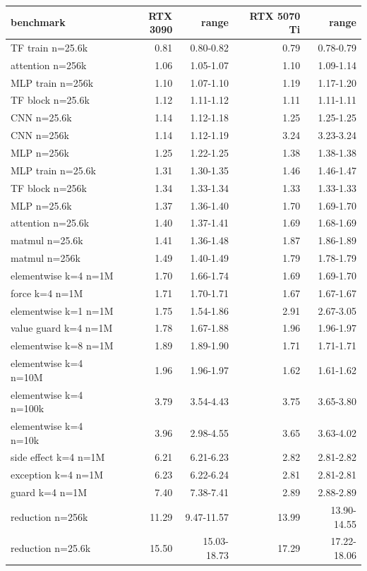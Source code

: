 \begin{tabular}{lrrrr}
\toprule
benchmark & RTX 3090 & range & RTX 5070 Ti & range \\
\midrule
TF train n=25.6k & 0.81 & 0.80-0.82 & 0.79 & 0.78-0.79 \\
attention n=256k & 1.06 & 1.05-1.07 & 1.10 & 1.09-1.14 \\
MLP train n=256k & 1.10 & 1.07-1.10 & 1.19 & 1.17-1.20 \\
TF block n=25.6k & 1.12 & 1.11-1.12 & 1.11 & 1.11-1.11 \\
CNN n=25.6k & 1.14 & 1.12-1.18 & 1.25 & 1.25-1.25 \\
CNN n=256k & 1.14 & 1.12-1.19 & 3.24 & 3.23-3.24 \\
MLP n=256k & 1.25 & 1.22-1.25 & 1.38 & 1.38-1.38 \\
MLP train n=25.6k & 1.31 & 1.30-1.35 & 1.46 & 1.46-1.47 \\
TF block n=256k & 1.34 & 1.33-1.34 & 1.33 & 1.33-1.33 \\
MLP n=25.6k & 1.37 & 1.36-1.40 & 1.70 & 1.69-1.70 \\
attention n=25.6k & 1.40 & 1.37-1.41 & 1.69 & 1.68-1.69 \\
matmul n=25.6k & 1.41 & 1.36-1.48 & 1.87 & 1.86-1.89 \\
matmul n=256k & 1.49 & 1.40-1.49 & 1.79 & 1.78-1.79 \\
elementwise k=4 n=1M & 1.70 & 1.66-1.74 & 1.69 & 1.69-1.70 \\
force k=4 n=1M & 1.71 & 1.70-1.71 & 1.67 & 1.67-1.67 \\
elementwise k=1 n=1M & 1.75 & 1.54-1.86 & 2.91 & 2.67-3.05 \\
value guard k=4 n=1M & 1.78 & 1.67-1.88 & 1.96 & 1.96-1.97 \\
elementwise k=8 n=1M & 1.89 & 1.89-1.90 & 1.71 & 1.71-1.71 \\
elementwise k=4 n=10M & 1.96 & 1.96-1.97 & 1.62 & 1.61-1.62 \\
elementwise k=4 n=100k & 3.79 & 3.54-4.43 & 3.75 & 3.65-3.80 \\
elementwise k=4 n=10k & 3.96 & 2.98-4.55 & 3.65 & 3.63-4.02 \\
side effect k=4 n=1M & 6.21 & 6.21-6.23 & 2.82 & 2.81-2.82 \\
exception k=4 n=1M & 6.23 & 6.22-6.24 & 2.81 & 2.81-2.81 \\
guard k=4 n=1M & 7.40 & 7.38-7.41 & 2.89 & 2.88-2.89 \\
reduction n=256k & 11.29 & 9.47-11.57 & 13.99 & 13.90-14.55 \\
reduction n=25.6k & 15.50 & 15.03-18.73 & 17.29 & 17.22-18.06 \\
\bottomrule
\end{tabular}
